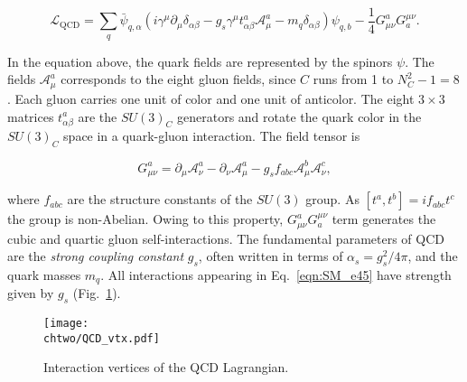 \begin{equation}\label{eqn:SM_e46}
\mathcal{L}_\mathrm{QCD} = \sum_{q} \bar{\psi}_{q,\alpha} (i\gamma^\mu\partial_\mu\delta_{\alpha\beta} - g_s\gamma^\mu t^a_{\alpha\beta}\mathcal{A}^a_\mu - m_q\delta_{\alpha\beta})\psi_{q,b} - \frac{1}{4}G^a_{\mu\nu}G^{\mu\nu}_a.
\end{equation}

In the equation above, the quark fields are represented by the spinors $\psi$. The fields $\mathcal{A}^a_\mu$ corresponds to the eight gluon fields, since $C$ runs from 1 to $N^2_C - 1 = 8$.
Each gluon carries one unit of color and one unit of anticolor.
The eight $3\times3$ matrices $t^a_{\alpha\beta}$ are the $SU(3)_C$ generators and rotate the quark color in the $SU(3)_C$ space in a quark-gluon interaction.
The field tensor is

\begin{equation}\label{eqn:SM_e47}
G^a_{\mu\nu} = \partial_\mu\mathcal{A}^a_\nu - \partial_\nu\mathcal{A}^a_\mu - g_s f_{abc}\mathcal{A}^b_\mu\mathcal{A}^c_\nu,
\end{equation}

\noindent where $f_{abc}$ are the structure constants of the $SU(3)$ group.
As $[t^a,t^b] = if_{abc}t^c$ the group is non-Abelian. Owing to this property, $G^a_{\mu\nu}G^{\mu\nu}_a$ term generates the cubic and quartic gluon self-interactions.
The fundamental parameters of QCD are the \textit{strong coupling constant} $g_s$, often written in terms of $\alpha_s = g_s^2/4\pi$, and the quark masses $m_q$.
All interactions appearing in Eq.~\ref{eqn:SM_e45} have strength given by $g_s$ (Fig.~\ref{fig:QCDVtx}).\\

\begin{figure}[!htb]
\centering
\texttt{[image: \\chtwo/QCD\_vtx.pdf]}
\caption{Interaction vertices of the QCD Lagrangian.}
\label{fig:QCDVtx}
\end{figure}


